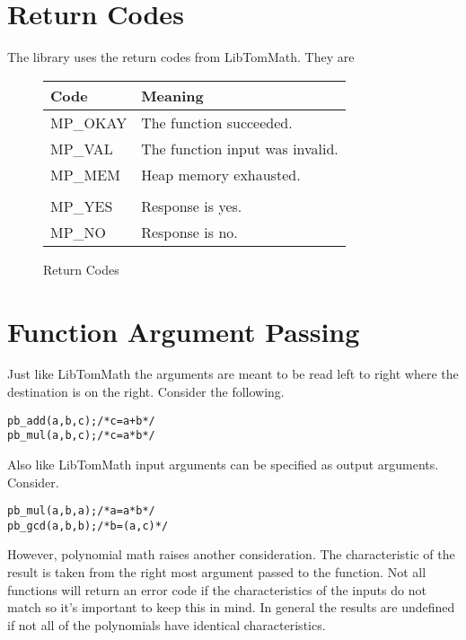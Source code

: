 \documentclass[b5paper]{book}
\begin{document}
\section{Return Codes}
The library uses the return codes from LibTomMath.  They are

\begin{figure}[here!]
\begin{center}
\begin{small}
\begin{tabular}{|l|l|}
\hline \textbf{Code} & \textbf{Meaning} \\
\hline MP\_OKAY & The function succeeded. \\
\hline MP\_VAL  & The function input was invalid. \\
\hline MP\_MEM  & Heap memory exhausted. \\
\hline &\\
\hline MP\_YES  & Response is yes. \\
\hline MP\_NO   & Response is no. \\
\hline
\end{tabular}
\end{small}
\end{center}
\caption{Return Codes}
\end{figure}

\section{Function Argument Passing}
Just like LibTomMath the arguments are meant to be read left to right where the destination is on the right.  Consider
the following.

\begin{alltt}
pb_add(a, b, c);   /* c = a + b */
pb_mul(a, b, c);   /* c = a * b */
\end{alltt}

Also like LibTomMath input arguments can be specified as output arguments.  Consider.

\begin{alltt}
pb_mul(a, b, a);   /* a = a * b */
pb_gcd(a, b, b);   /* b = (a, c) */
\end{alltt}

However, polynomial math raises another consideration.  The characteristic of the result is taken from the right most
argument passed to the function.  Not all functions will return an error code if the characteristics of the inputs
do not match so it's important to keep this in mind.  In general the results are undefined if not all of the polynomials
have identical characteristics.
\end{document}
